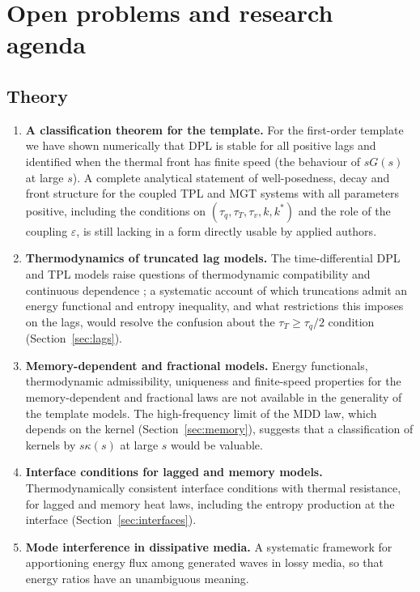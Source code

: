 \section{Open problems and research agenda}\label{sec:open}
\subsection{Theory}
\begin{enumerate}
\item \textbf{A classification theorem for the template.} For the first-order template we have shown numerically that DPL is stable for all positive lags and identified when the thermal front has finite speed (the behaviour of $sG(s)$ at large $s$). A complete analytical statement of well-posedness, decay and front structure for the coupled TPL and MGT systems with all parameters positive, including the conditions on $(\tau_q,\tau_T,\tau_v,k,k^*)$ and the role of the coupling $\varepsilon$, is still lacking in a form directly usable by applied authors.
\item \textbf{Thermodynamics of truncated lag models.} The time-differential DPL and TPL models raise questions of thermodynamic compatibility and continuous dependence \citep{Chirita2016,Tibullo2017}; a systematic account of which truncations admit an energy functional and entropy inequality, and what restrictions this imposes on the lags, would resolve the confusion about the $\tau_T\ge\tau_q/2$ condition (Section~\ref{sec:lags}).
\item \textbf{Memory-dependent and fractional models.} Energy functionals, thermodynamic admissibility, uniqueness and finite-speed properties for the memory-dependent and fractional laws are not available in the generality of the template models. The high-frequency limit of the MDD law, which depends on the kernel (Section~\ref{sec:memory}), suggests that a classification of kernels by $s\kappa(s)$ at large $s$ would be valuable.
\item \textbf{Interface conditions for lagged and memory models.} Thermodynamically consistent interface conditions with thermal resistance, for lagged and memory heat laws, including the entropy production at the interface (Section~\ref{sec:interfaces}).
\item \textbf{Mode interference in dissipative media.} A systematic framework for apportioning energy flux among generated waves in lossy media, so that energy ratios have an unambiguous meaning.
\end{enumerate}
